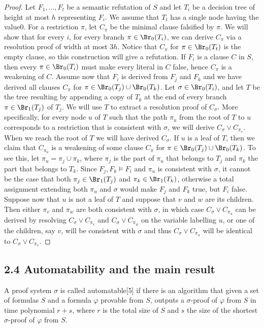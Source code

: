 \begin{proof}
Let $F_1,\ldots,F_t$ be a semantic refutation of $S$ and let $T_i$ be a decision tree of height at most $h$ representing $F_i$. We assume that $T_t$ has a single node having the value0. For a restriction $\pi$, let $C_\pi$ be the minimal clause falsified by $\pi$. We will show that for every $i$, for every branch $\pi\in\Br_0(T_i)$, we can derive $C_\pi$ via a resolution proof of width at most $3h$. Notice that $C_\pi$ for $\pi\in\Br_0(T_t)$ is the empty clause, so this construction will give a refutation.
If $F_i$ is a clause $C$ in $S$, then every $\pi\in\Br_0(T_i)$ must make every literal in $C$ false, hence $C_\pi$ is a weakening of $C$. Assume now that $F_i$ is derived from $F_j$ and $F_k$ and we have derived all clauses $C_\pi$ for $\pi\in\Br_0(T_j)\cup\Br_0(T_k)$. Let $\sigma\in\Br_0(T_i)$, and let $T$ be the tree resulting by appending a copy of $T_k$ at the end of every branch $\pi\in\Br_1(T_j)$ of $T_j$. We will use $T$ to extract a resolution proof of $C_\sigma$. More specifically, for every node $u$ of $T$ such that the path $\pi_u$ from the root of $T$ to $u$ corresponds to a restriction that is consistent with $\sigma$, we will derive $C_\sigma\vee C_{\pi_v}$. When we reach the root of $T$ we will have derived $C_\sigma$. If $u$ is a leaf of $T$, then we claim that $C_{\pi_u}$ is a weakening of some clause $C_\pi$ for $\pi\in\Br_0(T_j)\cup\Br_0(T_k)$. To see this, let $\pi_u=\pi_j\cup\pi_k$, where $\pi_j$ is the part of $\pi_u$ that belongs to $T_j$ and $\pi_k$ the part that belongs to $T_k$. Since $F_j,F_k\models F_i$ and $\pi_u$ is consistent with $\sigma$, it cannot be the case that both $\pi_j\in\Br_1(T_j)$ and $\pi_k\in\Br_1(T_k)$, otherwise a total assignment extending both $\pi_u$ and $\sigma$ would make $F_j$ and $F_k$ true, but $F_i$ false. Suppose now that $u$ is not a leaf of $T$ and suppose that $v$ and $w$ are its children. Then either $\pi_v$ and $\pi_w$ are both consistent with $\sigma$, in which case $C_\sigma\vee C_{\pi_u}$ can be derived by resolving $C_\sigma\vee C_{\pi_v}$ and $C_\sigma\vee C_{\pi_w}$ on the variable labelling $u$, or one of the children, say $v$, will be consistent with $\sigma$ and thus $C_\sigma\vee C_{\pi_u}$ will be identical to $C_\sigma\vee C_{\pi_v}$.
\end{proof}
\subsection*{2.4 Automatability and the main result}
A proof system $\sigma$ is called automatable[5] if there is an algorithm that given a set of formulas $S$ and a formula $\varphi$ provable from $S$, outputs a $\sigma$-proof of $\varphi$ from $S$ in time polynomial $r+s$, where $r$ is the total size of $S$ and $s$ the size of the shortest $\sigma$-proof of $\varphi$ from $S$.
